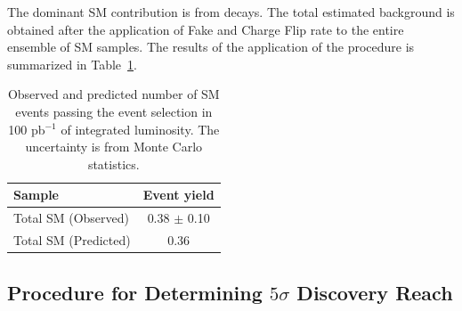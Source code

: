 The dominant SM contribution is from \ttbar decays. The total estimated background 
is obtained after the application of Fake and Charge Flip rate to the entire ensemble
of SM samples. The results of the application of the procedure is summarized in Table~\ref{tab:sm_preditcion}.

\begin{table}[hbt]
\begin{center}
\begin{tabular}{|l|c|}\hline
Sample & Event yield \\ \hline
Total SM (Observed) & 0.38 $\pm$ 0.10 \\
Total SM (Predicted) & 0.36 \\
\hline
\end{tabular}
\caption{ Observed and predicted number of SM events passing the event selection in 100 pb$^{-1}$ of integrated luminosity. The uncertainty is from Monte Carlo statistics.\label{tab:sm_preditcion}}
\end{center}
\end{table}

\subsection{Procedure for Determining $5\sigma$ Discovery Reach}
\label{sec:significance}

